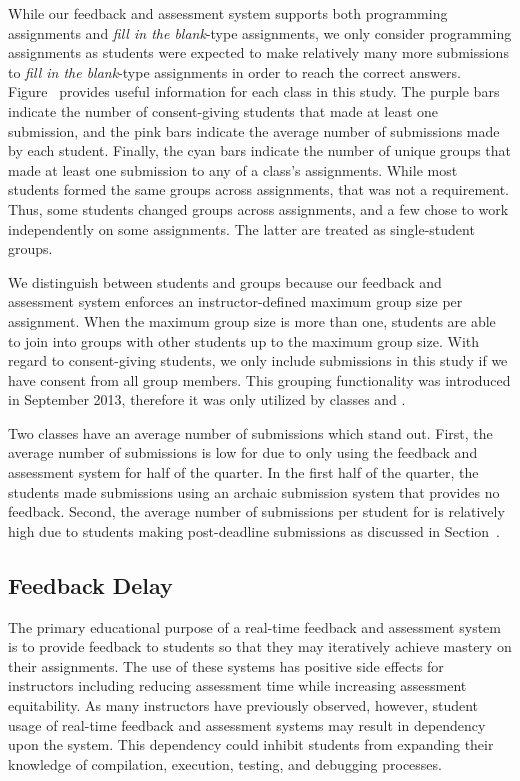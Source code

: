 While our feedback and assessment system supports both programming assignments
and \emph{fill in the blank}-type assignments, we only consider programming
assignments as students were expected to make relatively many more submissions
to \emph{fill in the blank}-type assignments in order to reach the correct
answers. Figure~ provides useful information for each
class in this study. The purple bars indicate the number of consent-giving
students that made at least one submission, and the pink bars indicate the
average number of submissions made by each student. Finally, the cyan bars
indicate the number of unique groups that made at least one submission to any
of a class's assignments. While most students formed the same groups across
assignments, that was not a requirement. Thus, some students changed groups
across assignments, and a few chose to work independently on some
assignments. The latter are treated as single-student groups.

We distinguish between students and groups because our feedback and assessment
system enforces an instructor-defined maximum group size per assignment. When
the maximum group size is more than one, students are able to join into groups
with other students up to the maximum group size. With regard to consent-giving
students, we only include submissions in this study if we have consent from all
group members. This grouping functionality was introduced in September 2013,
therefore it was only utilized by classes  and .

Two classes have an average number of submissions which stand out. First, the
average number of submissions is low for  due to only using the
feedback and assessment system for half of the quarter. In the first half of
the quarter, the students made submissions using an archaic submission system
that provides no feedback. Second, the average number of submissions per
student for  is relatively high due to students making post-deadline
submissions as discussed in Section~.


\subsection{Feedback Delay} 
The primary educational purpose of a real-time feedback and assessment system
is to provide feedback to students so that they may iteratively achieve mastery
on their assignments. The use of these systems has positive side effects for
instructors including reducing assessment time while increasing assessment
equitability. As many instructors have previously observed, however, student
usage of real-time feedback and assessment systems may result in dependency
upon the system. This dependency could inhibit students from expanding their
knowledge of compilation, execution, testing, and debugging processes.

